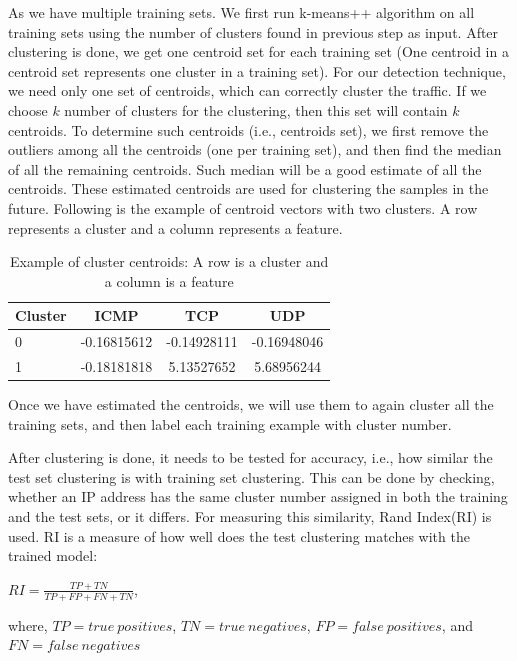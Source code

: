 \documentclass[12pt,oneside,a4paper]{article}
\begin{document}
As we have multiple training sets. We first run k-means++ algorithm on all training sets using the number of clusters found in previous step as input. After clustering is done, we get one centroid set for each training set (One centroid in a centroid set represents one cluster in a training set). For our detection technique, we need only one set of centroids, which can correctly cluster the traffic. If we choose $k$ number of clusters for the clustering, then this set will contain $k$ centroids. To determine such centroids (i.e., centroids set), we first remove the outliers among all the centroids (one per training set), and then find the median of all the remaining centroids. Such median will be a good estimate of all the centroids. These estimated centroids are used for clustering the samples in the future. Following is the example of centroid vectors with two clusters. A row represents a cluster and a column represents a feature.

\begin{table}[H]
\centering
  \begin{tabular}{ l | c  c  c }
    Cluster      & ICMP  & TCP  & UDP \\
    \hline
    0         &{-0.16815612}       &{-0.14928111}    &{-0.16948046} \\
    1         &{-0.18181818}       &{5.13527652}     &{5.68956244} \\
  \end{tabular}
\caption{Example of cluster centroids: A row is a cluster and a column is a feature} \label{table:centroids-example}
\end{table}

Once we have estimated the centroids, we will use them to again cluster all the training sets, and then label each training example with cluster number.

After clustering is done, it needs to be tested for accuracy, i.e., how similar the test set clustering is with training set clustering. This can be done by checking, whether an IP address has the same cluster number assigned in both the training and the test sets, or it differs. For measuring this similarity, Rand Index(RI)\cite{ri-index} is used. RI is a measure of how well does the test clustering matches with the trained model:

\hspace{4cm} $RI={\frac {TP+TN}{TP+FP+FN+TN}}$,

where,
$TP= true\ positives$, $TN=true\ negatives$, $FP= false\ positives$, and $FN= false\ negatives$
\end{document}
